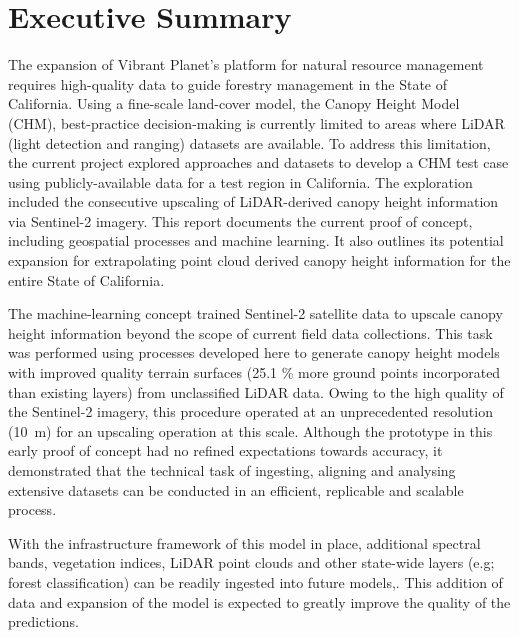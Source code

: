 \section*{Executive Summary}

The expansion of Vibrant Planet's platform for natural resource management requires high-quality data to guide forestry management in the State of California. Using a fine-scale land-cover model, the Canopy Height Model (CHM), best-practice decision-making is currently limited to areas where LiDAR (light detection and ranging) datasets are available. 
To address this limitation, the current project explored approaches and datasets to develop a CHM test case using publicly-available data for a test region
in California.  The exploration included the consecutive upscaling of LiDAR-derived canopy height information via Sentinel-2 imagery. This report documents the current
 proof of concept, including geospatial processes and machine learning. It also outlines its potential expansion for extrapolating point cloud derived canopy height information for the entire State of California.

 The machine-learning concept trained Sentinel-2 satellite data to upscale canopy height information beyond the 
 scope of current field data collections. This task was performed using processes developed here to generate 
 canopy height models with improved quality terrain surfaces (25.1 \% more ground points incorporated than existing layers) from unclassified LiDAR data. Owing to the high quality 
 of the Sentinel-2 imagery, this procedure operated at an unprecedented resolution (10~m) for an upscaling operation at this scale.  
Although the prototype in this early proof of concept had no refined expectations towards accuracy, it demonstrated that the technical 
task of ingesting, aligning and analysing extensive datasets can be conducted in an efficient, replicable and scalable process. 

With the infrastructure framework of this model in place, additional spectral bands, vegetation indices, LiDAR point clouds and other state-wide layers 
(e.g; forest classification) can be readily ingested into future models,. This addition of data and expansion of the model is
expected to greatly improve the quality of the predictions.

%
